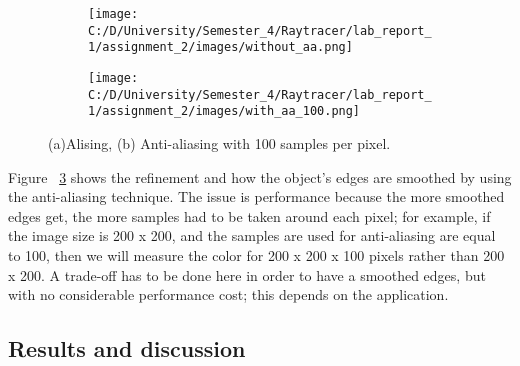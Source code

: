 \documentclass{article}
\begin{document}
	\begin{figure}[ht]
		\begin{center}
			\begin{subfigure}{.3\textwidth}
				\centering
				\texttt{[image: C:/D/University/Semester\_4/Raytracer/lab\_report\_1/assignment\_2/images/without\_aa.png]}  
				\caption{}
				\label{fig:sub-first}
			\end{subfigure}
			\begin{subfigure}{.3\textwidth}
				\centering
				\texttt{[image: C:/D/University/Semester\_4/Raytracer/lab\_report\_1/assignment\_2/images/with\_aa\_100.png]}  
				\caption{}
				\label{fig:sub-second}
			\end{subfigure}
			
			\caption{(a)Alising,  (b) Anti-aliasing with 100 samples per pixel.}
			\label{fig:4}
		\end{center}
	\end{figure}
	
	
	Figure ~\ref{fig:4} shows the refinement and how the object's edges are smoothed by using the anti-aliasing technique. The issue is performance because the more smoothed edges get, the more samples had to be taken around each pixel; for example, if the image size is 200 x 200, and the samples are used for anti-aliasing are equal to 100, then we will measure the color for 200 x 200 x 100 pixels rather than 200 x 200. 
	A trade-off has to be done here in order to have a smoothed edges, but with no considerable performance cost; this depends on the application. 
	
	
	
	
	\subsection{Results and discussion}
	
\end{document}
